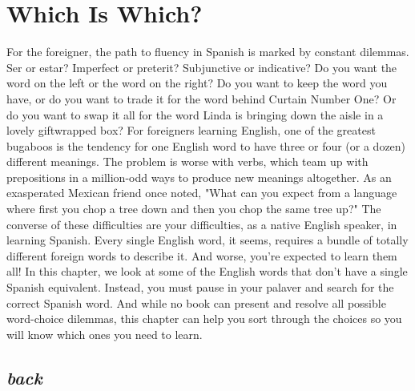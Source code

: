 \chapter{Which Is Which?}

For the foreigner, the path to fluency in Spanish is marked by
constant dilemmas. Ser or estar? Imperfect or preterit? Subjunctive
or indicative? Do you want the word on the left or the word on the
right? Do you want to keep the word you have, or do you want to trade
it for the word behind Curtain Number One? Or do you want to swap
it all for the word Linda is bringing down the aisle in a lovely giftwrapped box?
For foreigners learning English, one of the greatest bugaboos
is the tendency for one English word to have three or four (or a dozen)
different meanings. The problem is worse with verbs, which team up
with prepositions in a million-odd ways to produce new meanings altogether. As an exasperated Mexican friend once noted, "What can you
expect from a language where first you chop a tree down and then you
chop the same tree up?"
The converse of these difficulties are your difficulties, as a native English speaker, in learning Spanish. Every single English word, it
seems, requires a bundle of totally different foreign words to describe
it. And worse, you're expected to learn them all!
In this chapter, we look at some of the English words that
don't have a single Spanish equivalent. Instead, you must pause in your
palaver and search for the correct Spanish word. And while no book
can present and resolve all possible word-choice dilemmas, this chapter can help you sort through the choices so you will know which ones
you need to learn.

\section{\emph{back}}

